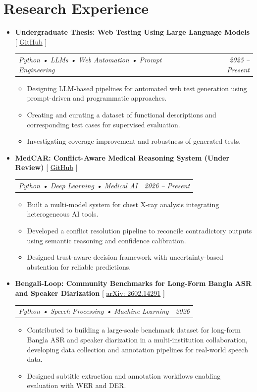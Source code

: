 \documentclass[a4paper,10pt]{article}
\makeatletter
\newcommand{\resumeSubHeadingListStart}{\begin{itemize}[leftmargin=*, itemsep=0.4mm, topsep=0.4mm]}
\newcommand{\resumeSubHeadingListEnd}{\end{itemize}\vspace{-1mm}}
\newcommand{\resumeItemListStart}{\begin{itemize}[leftmargin=*, itemsep=0.4mm, topsep=0.3mm, parsep=0mm, partopsep=0mm]}
\newcommand{\resumeItemListEnd}{\end{itemize}\vspace{0.5mm}}
\newcommand{\resumeProject}[4]{
  \item \textbf{#1} \hspace{0.4em} {\small #2} \\
  \begin{tabular*}{\linewidth}{@{}l@{\extracolsep{\fill}}r@{}}
    \textit{#3} & \textit{#4}
  \end{tabular*}
  \vspace{-4mm}
}
\makeatother
\begin{document}
\section{Research Experience}

\resumeSubHeadingListStart

\resumeProject
{Undergraduate Thesis: Web Testing Using Large Language Models}
{[ \href{https://github.com/mninadmnobo/Test-Case-Generator}{GitHub} ]}
{Python • LLMs • Web Automation • Prompt Engineering}
{2025 -- Present}
\resumeItemListStart
\item Designing LLM-based pipelines for automated web test generation using prompt-driven and programmatic approaches.
\item Creating and curating a dataset of functional descriptions and corresponding test cases for supervised evaluation.
\item Investigating coverage improvement and robustness of generated tests.
\resumeItemListEnd

\resumeProject
{MedCAR: Conflict-Aware Medical Reasoning System (Under Review)}
{[ \href{https://github.com/mninadmnobo/MedCAR}{GitHub} ]}
{Python • Deep Learning • Medical AI}
{2026 -- Present}
\resumeItemListStart
\item Built a multi-model system for chest X-ray analysis integrating heterogeneous AI tools.
\item Developed a conflict resolution pipeline to reconcile contradictory outputs using semantic reasoning and confidence calibration.
\item Designed trust-aware decision framework with uncertainty-based abstention for reliable predictions.
\resumeItemListEnd

\resumeProject
{Bengali-Loop: Community Benchmarks for Long-Form Bangla ASR and Speaker Diarization}
{[ \href{https://arxiv.org/abs/2602.14291}{arXiv: 2602.14291} ]}
{Python • Speech Processing • Machine Learning}
{2026}
\resumeItemListStart
\item Contributed to building a large-scale benchmark dataset for long-form Bangla ASR and speaker diarization in a multi-institution collaboration, developing data collection and annotation pipelines for real-world speech data.
\item Designed subtitle extraction and annotation workflows enabling evaluation with WER and DER.
\resumeItemListEnd

\resumeSubHeadingListEnd
\end{document}
